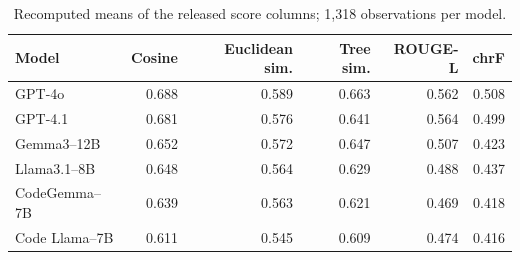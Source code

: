 \begin{table}[H]
\centering\small
\caption{Recomputed means of the released score columns; 1,318 observations per model.}
\label{tab:scores}
\begin{tabular}{@{}lrrrrr@{}}
\toprule
Model & Cosine & Euclidean sim. & Tree sim. & ROUGE-L & chrF\\
\midrule
GPT-4o & 0.688 & 0.589 & 0.663 & 0.562 & 0.508\\
GPT-4.1 & 0.681 & 0.576 & 0.641 & 0.564 & 0.499\\
Gemma3--12B & 0.652 & 0.572 & 0.647 & 0.507 & 0.423\\
Llama3.1--8B & 0.648 & 0.564 & 0.629 & 0.488 & 0.437\\
CodeGemma--7B & 0.639 & 0.563 & 0.621 & 0.469 & 0.418\\
Code Llama--7B & 0.611 & 0.545 & 0.609 & 0.474 & 0.416\\
\bottomrule
\end{tabular}
\par\vspace{0.3em}{\footnotesize Similarity scores are reused from the release; summaries are newly computed. Tree scores retain the original parser failure behavior.}
\end{table}
